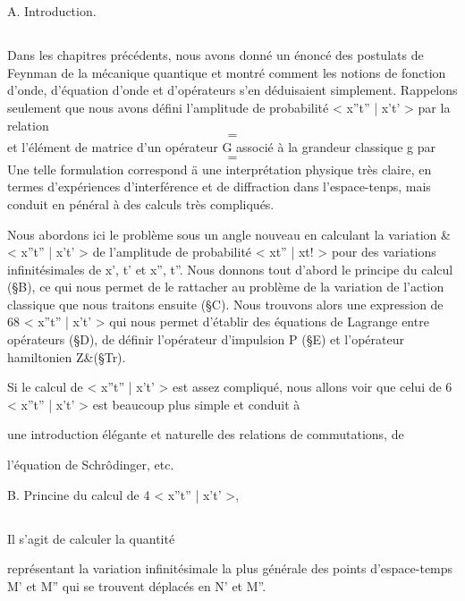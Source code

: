 
\chapter{}
A. Introduction.
\section{}

Dans les chapitres précédents, nous avons donné un énoncé
des postulats de Feynman de la mécanique quantique et montré comment
les notions de fonction d'onde, d'équation d'onde et d'opérateurs s'en
déduisaient simplement. Rappelons seulement que nous avons défini l'amplitude de probabilité < x''t'' | x't' > par la relation
\[
\tag{1}=
\]
et l'élément de matrice d'un opérateur G associé à la grandeur classique
g par
\[
\tag{2}=
\]
Une telle formulation correspond ä une interprétation physique très claire,
en termes d'expériences d'interférence et de diffraction dans l'espace-tenps,
mais conduit en pénéral à des calculs très compliqués.

Nous abordons ici le problème sous un angle nouveau en calculant
la variation & < x''t'' | x't' > de l'amplitude de probabilité < xt'' | xt! >
pour des variations infinitésimales de x', t' et x'', t''. Nous donnons tout
d'abord le principe du calcul (\S B), ce qui nous permet de le rattacher
au problème de la variation de l'action classique que nous traitons ensuite
(\S C). Nous trouvons alors une expression de 68 < x''t'' | x't' > qui nous
permet d'établir des équations de Lagrange entre opérateurs (\S D), de définir
l'opérateur d'impulsion P (\S E) et l'opérateur hamiltonien Z&(\S Tr).

Si le calcul de < x''t'' | x't' > est assez compliqué, nous allons
voir que celui de 6 < x''t'' | x't' > est beaucoup plus simple et conduit à

une introduction élégante et naturelle des relations de commutations, de

l'équation de Schrôdinger, etc.

B. Princine du calcul de 4 < x''t'' | x't' >,
\section{}

Il s'agit de calculer la quantité

représentant la variation infinitésimale la plus
générale des points d'espace-temps M' et M'' qui se trouvent déplacés
en N' et M''.

